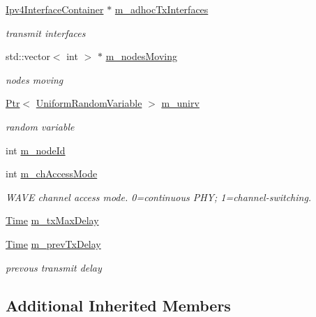 \begin{DoxyCompactItemize}
\hyperlink{classns3_1_1Ipv4InterfaceContainer}{Ipv4\+Interface\+Container} $\ast$ \hyperlink{classns3_1_1BsmApplication_a0eecb4df76f2dd46564c5f0b14260e3b}{m\+\_\+adhoc\+Tx\+Interfaces}
\begin{DoxyCompactList}\small\item\em transmit interfaces \end{DoxyCompactList}\item 
std\+::vector$<$ int $>$ $\ast$ \hyperlink{classns3_1_1BsmApplication_a573c92bdce7e395c9509e3b856d8fa6c}{m\+\_\+nodes\+Moving}
\begin{DoxyCompactList}\small\item\em nodes moving \end{DoxyCompactList}\item 
\hyperlink{classns3_1_1Ptr}{Ptr}$<$ \hyperlink{classns3_1_1UniformRandomVariable}{Uniform\+Random\+Variable} $>$ \hyperlink{classns3_1_1BsmApplication_a8c6f7e06af51ef84b38358397b2d3cdc}{m\+\_\+unirv}
\begin{DoxyCompactList}\small\item\em random variable \end{DoxyCompactList}\item 
int \hyperlink{classns3_1_1BsmApplication_aa94eecd18ffb201c13f58329781b77b6}{m\+\_\+node\+Id}
\item 
int \hyperlink{classns3_1_1BsmApplication_a752ca9febaa0e054d095240671dfc9f2}{m\+\_\+ch\+Access\+Mode}
\begin{DoxyCompactList}\small\item\em W\+A\+VE channel access mode. 0=continuous P\+HY; 1=channel-\/switching. \end{DoxyCompactList}\item 
\hyperlink{classns3_1_1Time}{Time} \hyperlink{classns3_1_1BsmApplication_a30f0fb812b58a1bf98ec17129283dcb8}{m\+\_\+tx\+Max\+Delay}
\item 
\hyperlink{classns3_1_1Time}{Time} \hyperlink{classns3_1_1BsmApplication_a9fcac2779174fb7abfb6bcadf8c66f83}{m\+\_\+prev\+Tx\+Delay}
\begin{DoxyCompactList}\small\item\em prevous transmit delay \end{DoxyCompactList}\end{DoxyCompactItemize}
\subsection*{Additional Inherited Members}



